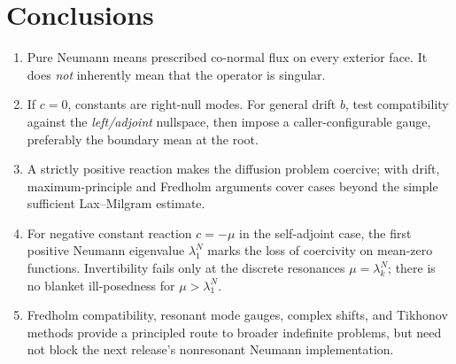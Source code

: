 \documentclass[11pt,letterpaper]{article}
\begin{document}
\section{Conclusions}
\begin{enumerate}
 \item Pure Neumann means prescribed co-normal flux on every exterior face.
       It does \emph{not} inherently mean that the operator is singular.
 \item If $c=0$, constants are right-null modes. For general drift $b$, test
       compatibility against the \emph{left/adjoint} nullspace, then impose
       a caller-configurable gauge, preferably the boundary mean at the root.
 \item A strictly positive reaction makes the diffusion problem coercive;
       with drift, maximum-principle and Fredholm arguments cover cases
       beyond the simple sufficient Lax--Milgram estimate.
 \item For negative constant reaction $c=-\mu$ in the self-adjoint case,
       the first positive Neumann eigenvalue $\lambda_1^N$ marks the loss of
       coercivity on mean-zero functions. Invertibility fails only at the
       discrete resonances $\mu=\lambda_k^N$; there is no blanket
       ill-posedness for $\mu>\lambda_1^N$.
 \item Fredholm compatibility, resonant mode gauges, complex shifts, and
       Tikhonov methods provide a principled route to broader indefinite
       problems, but need not block the next release's nonresonant Neumann
       implementation.
\end{enumerate}
\end{document}
